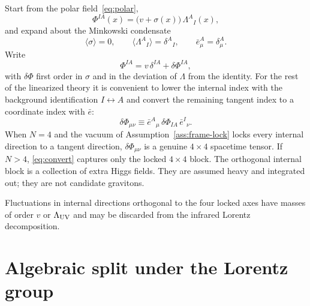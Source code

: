 Start from the polar field~\eqref{eq:polar},
\begin{equation}
  \label{eq:polar-again}
  \Phi^{IA}(x)=\bigl(v+\sigma(x)\bigr)\,\Lambda^A{}_I(x),
\end{equation}
and expand about the Minkowski condensate
\begin{equation}
  \label{eq:polar-bg}
  \langle\sigma\rangle=0,
  \qquad
  \langle\Lambda^A{}_I\rangle=\delta^A{}_I,
  \qquad
  \bar e^A_\mu=\delta^A_\mu.
\end{equation}
Write
\begin{equation}
  \label{eq:delta-Phi}
  \Phi^{IA}
  =v\,\delta^{IA}
   +\delta\Phi^{IA},
\end{equation}
with \(\delta\Phi\) first order in \(\sigma\) and in the deviation of
\(\Lambda\) from the identity. For the rest of the linearized theory
it is convenient to lower the internal index with the background
identification \(I\leftrightarrow A\) and convert the remaining tangent
index to a coordinate index with \(\bar e\):
\begin{equation}
  \label{eq:convert}
  \delta\Phi_{\mu\nu}
  \equiv
  \bar e^A{}_\mu\,\delta\Phi_{IA}\,
  \bar e^I{}_\nu.
\end{equation}
When \(N=4\) and the vacuum of Assumption~\ref{ass:frame-lock} locks
every internal direction to a tangent direction, \(\delta\Phi_{\mu\nu}\)
is a genuine \(4\times 4\) spacetime tensor. If \(N>4\),
\eqref{eq:convert} captures only the locked \(4\times 4\) block. The
orthogonal internal block is a collection of extra Higgs fields. They
are assumed heavy and integrated out; they are not candidate gravitons.

\begin{assumption}
  \label{ass:locked-block}
  Fluctuations in internal directions orthogonal to the four locked
  axes have masses of order \(v\) or \(\Lambda_{\mathrm{UV}}\) and may be discarded
  from the infrared Lorentz decomposition.
\end{assumption}

\section{Algebraic split under the Lorentz group}
\label{sec:ch5-algebra}

